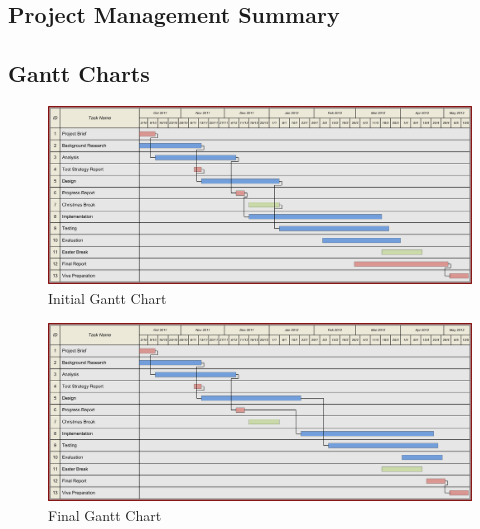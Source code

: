\subsection{Project Management Summary}


\clearpage
\begin{landscape}
\subsection{Gantt Charts}
\begin{figure}[htb]
\centering
\includegraphics[scale=0.75]{img/3yp-gantt.png}
\caption{Initial Gantt Chart}
\label{fig:chart-1}
\end{figure}
\end{landscape}
\clearpage
\begin{landscape}
\begin{figure}[htb]
\centering
\includegraphics[scale=0.75]{img/3yp-gantt-final.png}
\caption{Final Gantt Chart}
\label{fig:chart-2}
\end{figure}
\end{landscape}

